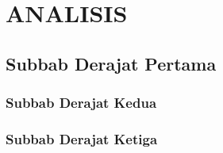 \chapter{ANALISIS}

\section{Subbab Derajat Pertama}
\lipsum[1-5]

\subsection{Subbab Derajat Kedua}
\lipsum[1]

\subsection{Subbab Derajat Ketiga}
\lipsum[1]